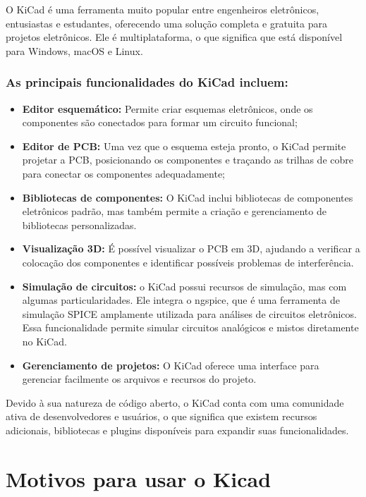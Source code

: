 O KiCad é uma ferramenta muito popular entre engenheiros eletrônicos, entusiastas e estudantes, oferecendo uma solução completa e gratuita para projetos eletrônicos. Ele é multiplataforma, o que significa que está disponível para Windows, macOS e Linux.

\hypertarget{as-principais-funcionalidades-do-kicad-incluem}{%
\subsubsection{As principais funcionalidades do KiCad incluem:}\label{as-principais-funcionalidades-do-kicad-incluem}}

\begin{itemize}
\tightlist
\item
  \textbf{Editor esquemático:} Permite criar esquemas eletrônicos, onde os componentes são conectados para formar um circuito funcional;
\item
  \textbf{Editor de PCB:} Uma vez que o esquema esteja pronto, o KiCad permite projetar a PCB, posicionando os componentes e traçando as trilhas de cobre para conectar os componentes adequadamente;
\item
  \textbf{Bibliotecas de componentes:} O KiCad inclui bibliotecas de componentes eletrônicos padrão, mas também permite a criação e gerenciamento de bibliotecas personalizadas.
\item
  \textbf{Visualização 3D:} É possível visualizar o PCB em 3D, ajudando a verificar a colocação dos componentes e identificar possíveis problemas de interferência.
\item
  \textbf{Simulação de circuitos:} o KiCad possui recursos de simulação, mas com algumas particularidades. Ele integra o ngspice, que é uma ferramenta de simulação SPICE amplamente utilizada para análises de circuitos eletrônicos. Essa funcionalidade permite simular circuitos analógicos e mistos diretamente no KiCad.
\item
  \textbf{Gerenciamento de projetos:} O KiCad oferece uma interface para gerenciar facilmente os arquivos e recursos do projeto.
\end{itemize}

Devido à sua natureza de código aberto, o KiCad conta com uma comunidade ativa de desenvolvedores e usuários, o que significa que existem recursos adicionais, bibliotecas e plugins disponíveis para expandir suas funcionalidades.

\hypertarget{motivos-para-usar-o-kicad}{%
\section{Motivos para usar o Kicad}\label{motivos-para-usar-o-kicad}}

